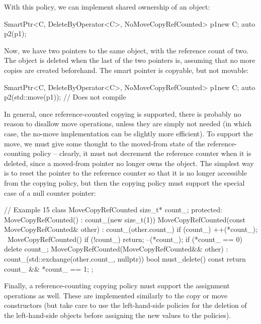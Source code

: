With this policy, we can implement shared ownership of an object:

\begin{code}
SmartPtr<C, DeleteByOperator<C>, NoMoveCopyRefCounted> p1{new C};
auto p2(p1);
\end{code}

Now, we have two pointers to the same object, with the reference count of two. The object is deleted when the last of the two pointers is, assuming that no more copies are created beforehand. The smart pointer is copyable, but not movable:

\begin{code}
SmartPtr<C, DeleteByOperator<C>, NoMoveCopyRefCounted> p1{new C};
auto p2(std::move(p1)); // Does not compile
\end{code}

In general, once reference-counted copying is supported, there is probably no reason to disallow move operations, unless they are simply not needed (in which case, the no-move implementation can be slightly more efficient). To support the move, we must give some thought to the moved-from state of the reference-counting policy -- clearly, it must not decrement the reference counter when it is deleted, since a moved-from pointer no longer owns the object. The simplest way is to reset the pointer to the reference counter so that it is no longer accessible from the copying policy, but then the copying policy must support the special case of a null counter pointer:

\begin{code}
// Example 15
class MoveCopyRefCounted {
  size_t* count_;
  protected:
  MoveCopyRefCounted() : count_(new size_t(1)) {}
  MoveCopyRefCounted(const MoveCopyRefCounted& other) :
    count_(other.count_)
  {
    if (count_) ++(*count_);
  }
  ~MoveCopyRefCounted() {
    if (!count_) return;
    --(*count_);
    if (*count_ == 0) {
      delete count_;
    }
  }
  MoveCopyRefCounted(MoveCopyRefCounted&& other) :
    count_(std::exchange(other.count_, nullptr)) {}
  bool must_delete() const {
    return count_ && *count_ == 1;
  }
};
\end{code}

Finally, a reference-counting copying policy must support the assignment operations as well. These are implemented similarly to the copy or move constructors (but take care to use the left-hand-side policies for the deletion of the left-hand-side objects before assigning the new values to the policies).

